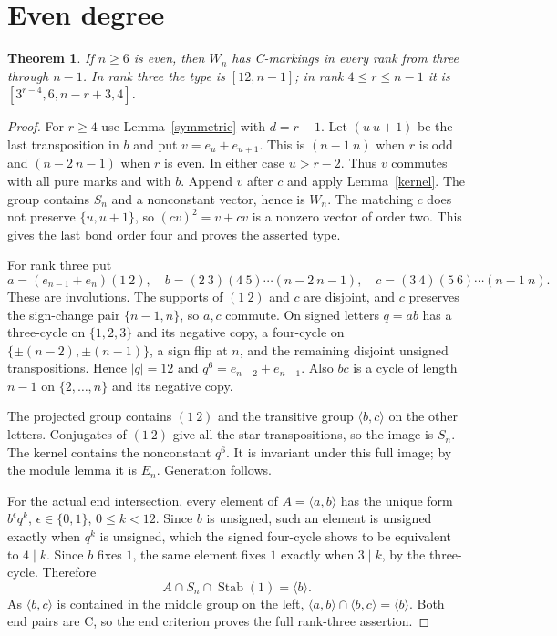 \documentclass[11pt,a4paper]{article}
\newtheorem{theorem}[lemma]{Theorem}
\newcommand{\gen}[1]{\langle#1\rangle}
\begin{document}
\section{Even degree}
\begin{theorem}\label{even}
If $n\ge6$ is even, then $W_n$ has C-markings in every rank from
three through $n-1$. In rank three the type is $[12,n-1]$;
in rank $4\le r\le n-1$ it is $[3^{r-4},6,n-r+3,4]$.
\end{theorem}
\begin{proof}
For $r\ge4$ use Lemma~\ref{symmetric} with $d=r-1$.
Let $(u\ u+1)$ be the last transposition in $b$ and put
$v=e_u+e_{u+1}$. This is $(n-1\ n)$ when $r$ is odd and
$(n-2\ n-1)$ when $r$ is even. In either case $u>r-2$.
Thus $v$ commutes with all pure marks and with $b$.
Append $v$ after $c$ and apply Lemma~\ref{kernel}.
The group contains $S_n$ and a nonconstant vector, hence is $W_n$.
The matching $c$ does not preserve $\{u,u+1\}$, so
$(cv)^2=v+cv$ is a nonzero vector of order two. This gives the
last bond order four and proves the asserted type.

For rank three put
\[
 a=(e_{n-1}+e_n)(1\ 2),\quad
 b=(2\ 3)(4\ 5)\cdots(n-2\ n-1),\quad
 c=(3\ 4)(5\ 6)\cdots(n-1\ n).
\]
These are involutions. The supports of $(1\ 2)$ and $c$ are
disjoint, and $c$ preserves the sign-change pair $\{n-1,n\}$,
so $a,c$ commute. On signed letters $q=ab$ has a three-cycle
on $\{1,2,3\}$ and its negative copy, a four-cycle on
$\{\pm(n-2),\pm(n-1)\}$, a sign flip at $n$, and the
remaining disjoint unsigned transpositions. Hence $|q|=12$
and $q^6=e_{n-2}+e_{n-1}$. Also $bc$ is a cycle of length
$n-1$ on $\{2,\ldots,n\}$ and its negative copy.

The projected group contains $(1\ 2)$ and the transitive group
$\gen{b,c}$ on the other letters. Conjugates of $(1\ 2)$ give
all the star transpositions, so the image is $S_n$. The kernel
contains the nonconstant $q^6$. It is invariant under this full
image; by the module lemma it is $E_n$. Generation follows.

For the actual end intersection, every element of $A=\gen{a,b}$
has the unique form $b^\epsilon q^k$, $\epsilon\in\{0,1\}$,
$0\le k<12$. Since $b$ is unsigned, such an element is unsigned
exactly when $q^k$ is unsigned, which the signed four-cycle shows
to be equivalent to $4\mid k$. Since $b$ fixes $1$, the same
element fixes $1$ exactly when $3\mid k$, by the three-cycle.
Therefore
\[
 A\cap S_n\cap\operatorname{Stab}(1)=\gen b.
\]
As $\gen{b,c}$ is contained in the middle group on the left,
$\gen{a,b}\cap\gen{b,c}=\gen b$. Both end pairs are C,
so the end criterion proves the full rank-three assertion.
\end{proof}
\end{document}
